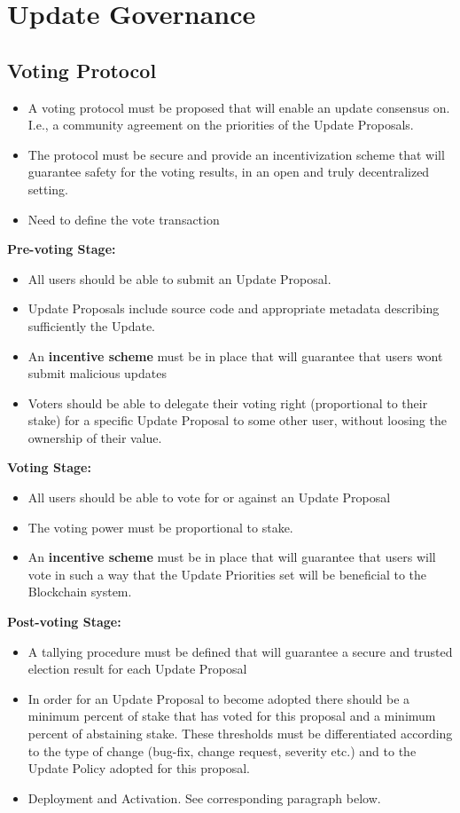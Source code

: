 \section{Update Governance}
\subsection*{Voting Protocol}
\begin{itemize}
\item A voting protocol must be proposed that will enable an update consensus on. I.e., a community agreement on the priorities of the Update Proposals. 
\item The protocol must be secure and provide an incentivization scheme that will guarantee safety for the voting results, in an open and truly decentralized setting.
\item Need to define the vote transaction
\end{itemize}

\textbf{Pre-voting Stage:}
\begin{itemize}
\item All users should be able to submit an Update Proposal.
\item Update Proposals include source code and appropriate metadata describing sufficiently the Update.
\item An \textbf{incentive scheme} must be in place that will guarantee that users wont submit malicious updates 
\item Voters should be able to delegate their voting right (proportional to their stake) for a specific Update Proposal to some other user, without loosing the ownership of their value.
\end{itemize}

\textbf{Voting Stage:}
\begin{itemize}
\item All users should be able to vote for or against an Update Proposal
\item The voting power must be proportional to stake.
\item An \textbf{incentive scheme} must be in place that will guarantee that users will vote in such a way that the Update Priorities set will be beneficial to the Blockchain system.
\end{itemize}

\textbf{Post-voting Stage:}
\begin{itemize}
\item A tallying procedure must be defined that will guarantee a secure and trusted election result for each Update Proposal
\item In order for an Update Proposal to become adopted there should be a minimum percent of stake that has voted for this proposal and a minimum percent of abstaining stake. These thresholds must be differentiated according to the type of change (bug-fix, change request, severity etc.) and to the Update Policy adopted for this proposal.
\item Deployment and Activation. See corresponding paragraph below.
\end{itemize}


